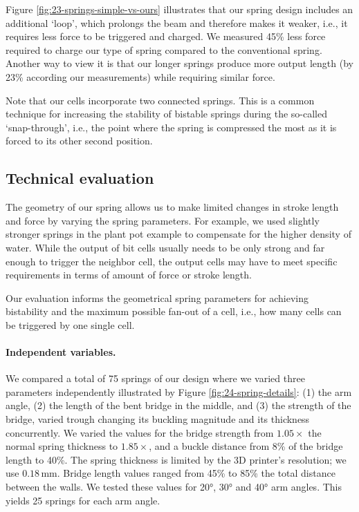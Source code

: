 Figure \ref{fig:23-springs-simple-vs-ours} illustrates that our spring design includes an additional `loop', which prolongs the beam and therefore makes it weaker, i.e., it requires less force to be triggered and charged. We measured 45\% less force required to charge our type of spring compared to the conventional spring. Another way to view it is that our longer springs produce more output length (by 23\% according our measurements) while requiring similar force. 

Note that our cells incorporate two connected springs. This is a common technique \cite{Qiu2004} for increasing the stability of bistable springs during the so-called `snap-through', i.e., the point where the spring is compressed the most as it is forced to its other second position. 


\subsection{Technical evaluation}

The geometry of our spring allows us to make limited changes in stroke length and force by varying the spring parameters. For example, we used slightly stronger springs in the plant pot example to compensate for the higher density of water. While the output of bit cells usually needs to be only strong and far enough to trigger the neighbor cell, the output cells may have to meet specific requirements in terms of amount of force or stroke length.

Our evaluation informs the geometrical spring parameters for achieving bistability and the maximum possible fan-out of a cell, i.e., how many cells can be triggered by one single cell.

\paragraph{Independent variables.} We compared a total of 75 springs of our design where we varied three parameters independently illustrated by Figure \ref{fig:24-spring-details}: (1) the arm angle, (2) the length of the bent bridge in the middle, and (3) the strength of the bridge, varied trough changing its buckling magnitude and its thickness concurrently. We varied the values for the bridge strength from $1.05 \times$ the normal spring thickness to $1.85 \times$, and a buckle distance from 8\% of the bridge length to 40\%. The spring thickness is limited by the 3D printer’s resolution; we use $0.18\, \mathrm{mm}$. Bridge length values ranged from 45\% to 85\% the total distance between the walls. We tested these values for 20°, 30° and 40° arm angles. This yields 25 springs for each arm angle.

